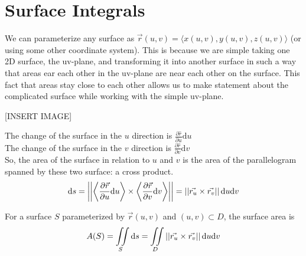 \section{Surface Integrals}
\noindent
We can parameterize any surface as $\vec{r}(u,v) = \langle x(u,v), y(u,v), z(u,v) \rangle$ (or using some other coordinate system). This is because we are simple taking one 2D surface, the uv-plane, and transforming it into another surface in such a way that areas ear each other in the uv-plane are near each other on the surface. This fact that areas stay close to each other allows us to make statement about the complicated surface while working with the simple uv-plane.

[INSERT IMAGE]

\noindent
The change of the surface in the $u$ direction is $\frac{\partial\hat{r}}{\partial u}\mathrm{d}u$\\
The change of the surface in the $v$ direction is $\frac{\partial\hat{r}}{\partial v}\mathrm{d}v$\\
So, the area of the surface in relation to $u$ and $v$ is the area of the parallelogram spanned by these two surface: a cross product.
\begin{equation*}
	\mathrm{d}s = \left|\left|\left< \frac{\partial\vec{r}}{\partial u}\mathrm{d}u \right> \times \left< \frac{\partial\vec{r}}{\partial v}\mathrm{d}v \right>\right|\right| = \left|\left|\vec{r_u} \times \vec{r_v}\right|\right|\mathrm{d}u\mathrm{d}v
\end{equation*}

\begin{definition}
	For a surface $S$ parameterized by $\vec{r}(u,v)$ and $(u,v)\subset D$, the surface area is
	\begin{equation*}
		A(S) = \iint\limits_{S}{\mathrm{d}s} = \iint\limits_{D}{\left|\left|\vec{r_u} \times \vec{r_v}\right|\right|\mathrm{d}u\mathrm{d}v}
	\end{equation*}
\end{definition}


